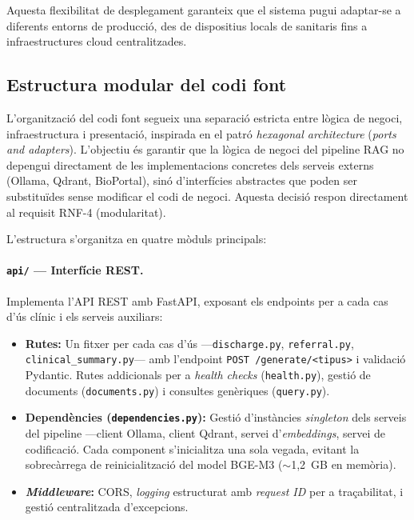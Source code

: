 \documentclass[CAT]{TFUOC}%
\begin{document}
Aquesta flexibilitat de desplegament garanteix que el sistema pugui adaptar-se a diferents entorns de producció, des de dispositius locals de sanitaris fins a infraestructures cloud centralitzades.

\subsection{Estructura modular del codi font}

L'organització del codi font segueix una separació estricta entre lògica de negoci, infraestructura i presentació, inspirada en el patró \textit{hexagonal architecture} (\textit{ports and adapters}). L'objectiu és garantir que la lògica de negoci del pipeline RAG no depengui directament de les implementacions concretes dels serveis externs (Ollama, Qdrant, BioPortal), sinó d'interfícies abstractes que poden ser substituïdes sense modificar el codi de negoci. Aquesta decisió respon directament al requisit RNF-4 (modularitat).

L'estructura s'organitza en quatre mòduls principals:

\paragraph{\texttt{api/} --- Interfície REST.}
Implementa l'API REST amb FastAPI, exposant els endpoints per a cada cas d'ús clínic i els serveis auxiliars:

\begin{itemize}
    \item \textbf{Rutes:} Un fitxer per cada cas d'ús ---\texttt{discharge.py}, \texttt{referral.py}, \texttt{clinical\_summary.py}--- amb l'endpoint \texttt{POST /generate/<tipus>} i validació Pydantic. Rutes addicionals per a \textit{health checks} (\texttt{health.py}), gestió de documents (\texttt{documents.py}) i consultes genèriques (\texttt{query.py}).

    \item \textbf{Dependències (\texttt{dependencies.py}):} Gestió d'instàncies \textit{singleton} dels serveis del pipeline ---client Ollama, client Qdrant, servei d'\textit{embeddings}, servei de codificació. Cada component s'inicialitza una sola vegada, evitant la sobrecàrrega de reinicialització del model BGE-M3 ($\sim$1,2~GB en memòria).

    \item \textbf{\textit{Middleware}:} CORS, \textit{logging} estructurat amb \textit{request ID} per a traçabilitat, i gestió centralitzada d'excepcions.
\end{itemize}
\end{document}
